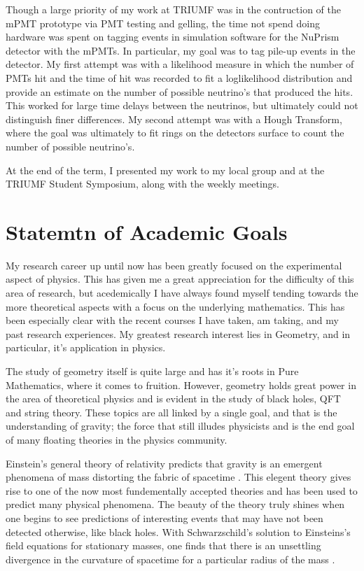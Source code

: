 \documentclass[12pt]{article}
\begin{document}
Though a large priority of my work at TRIUMF was in the contruction of the mPMT prototype via PMT testing and gelling, the time not spend doing hardware was spent on tagging events in simulation software for the NuPrism detector with the mPMTs. In particular, my goal was to tag pile-up events in the detector. My first attempt was with a likelihood measure in which the number of PMTs hit and the time of hit was recorded to fit a loglikelihood distribution and provide an estimate on the number of possible neutrino's that produced the hits. This worked for large time delays between the neutrinos, but ultimately could not distinguish finer differences. My second attempt was with a Hough Transform, where the goal was ultimately to fit rings on the detectors surface to count the number of possible neutrino's.

At the end of the term, I presented my work to my local group and at the TRIUMF Student Symposium, along with the weekly meetings.

\section{Statemtn of Academic Goals}
My research career up until now has been greatly focused on the experimental aspect of physics. This has given me a great appreciation for the difficulty of this area of research, but acedemically I have always found myself tending towards the more theoretical aspects with a focus on the underlying mathematics. This has been especially clear with the recent courses I have taken, am taking, and my past research experiences. My greatest research interest lies in Geometry, and in particular, it's application in physics.

The study of geometry itself is quite large and has it's roots in Pure Mathematics, where it comes to fruition. However, geometry holds great power in the area of theoretical physics and is evident in the study of black holes, QFT and string theory. These topics are all linked by a single goal, and that is the understanding of gravity; the force that still illudes physicists and is the end goal of many floating theories in the physics community.

Einstein's general theory of relativity predicts that gravity is an emergent phenomena of mass distorting the fabric of spacetime \cite{gr}. This elegent theory gives rise to one of the now most fundementally accepted theories and has been used to predict many physical phenomena. The beauty of the theory truly shines when one begins to see predictions of interesting events that may have not been detected otherwise, like black holes. With Schwarzschild's solution to Einsteins's field equations for stationary masses, one finds that there is an unsettling divergence in the curvature of spacetime for a particular radius of the mass \cite{mbh}.
\end{document}
